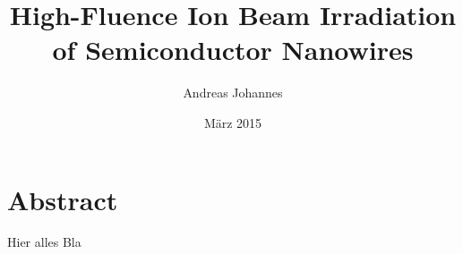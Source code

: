 \titlehead{Friedrich Schiller Universität Jena\\
PAF}
\subject{Dissertation}
\title{High-Fluence Ion Beam Irradiation of Semiconductor Nanowires}
\author{Andreas Johannes}
\date{März 2015}
\maketitle



\chapter*{Abstract}
\setcounter{page}{1}

Hier alles Bla
